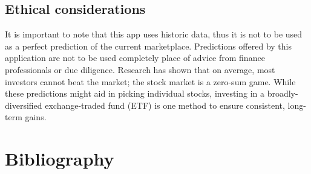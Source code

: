 \documentclass[11pt,]{article}
\begin{document}
\hypertarget{ethical-considerations}{%
\subsection{Ethical considerations}\label{ethical-considerations}}

It is important to note that this app uses historic data, thus it is not
to be used as a perfect prediction of the current marketplace.
Predictions offered by this application are not to be used completely
place of advice from finance professionals or due diligence. Research
has shown that on average, most investors cannot beat the market; the
stock market is a zero-sum game. While these predictions might aid in
picking individual stocks, investing in a broadly-diversified
exchange-traded fund (ETF) is one method to ensure consistent, long-term
gains.

\newpage

\hypertarget{bibliography}{%
\section{Bibliography}\label{bibliography}}
\end{document}

